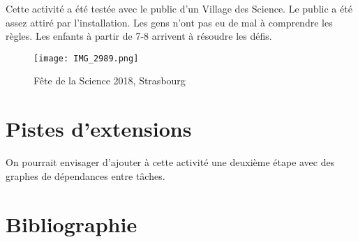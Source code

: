 \documentclass[a4paper]{article}
\begin{document}
Cette activité a été testée avec le public d'un Village des Science. Le public a été assez attiré par l'installation. Les gens n'ont pas eu de mal à comprendre les règles. Les enfants à partir de 7-8 arrivent à résoudre les défis.

\begin{figure}
\texttt{[image: IMG\_2989.png]}
\caption{Fête de la Science 2018, Strasbourg}
\end{figure}

\section{Pistes d'extensions}

On pourrait envisager d'ajouter à cette activité une deuxième étape avec des graphes de dépendances entre tâches.

\section{Bibliographie}
\end{document}
